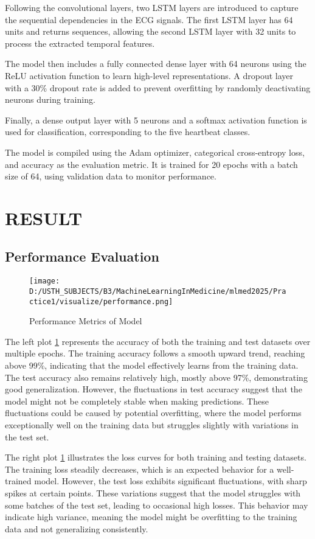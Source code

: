 \documentclass[10pt, conference]{IEEEtran}
\begin{document}
	Following the convolutional layers, two LSTM layers are introduced to capture the sequential dependencies in the ECG signals. The first LSTM layer has 64 units and returns sequences, allowing the second LSTM layer with 32 units to process the extracted temporal features.
	
	The model then includes a fully connected dense layer with 64 neurons using the ReLU activation function to learn high-level representations. A dropout layer with a 30\% dropout rate is added to prevent overfitting by randomly deactivating neurons during training.
	
	Finally, a dense output layer with 5 neurons and a softmax activation function is used for classification, corresponding to the five heartbeat classes.
	
	The model is compiled using the Adam optimizer, categorical cross-entropy loss, and accuracy as the evaluation metric. It is trained for 20 epochs with a batch size of 64, using validation data to monitor performance. 
	
	\section{\textbf{R}ESULT}
	\subsection{Performance Evaluation}
	
	\begin{figure}[H]
		\centering
		\texttt{[image: D:/USTH\_SUBJECTS/B3/MachineLearningInMedicine/mlmed2025/Practice1/visualize/performance.png]}
		\caption{Performance Metrics of Model}
		\label{fig:performance}
	\end{figure}
	
	The left plot \ref{fig:performance} represents the accuracy of both the training and test datasets over multiple epochs. The training accuracy follows a smooth upward trend, reaching above 99\%, indicating that the model effectively learns from the training data. The test accuracy also remains relatively high, mostly above 97\%, demonstrating good generalization. However, the fluctuations in test accuracy suggest that the model might not be completely stable when making predictions. These fluctuations could be caused by potential overfitting, where the model performs exceptionally well on the training data but struggles slightly with variations in the test set.
	
	The right plot \ref{fig:performance} illustrates the loss curves for both training and testing datasets. The training loss steadily decreases, which is an expected behavior for a well-trained model. However, the test loss exhibits significant fluctuations, with sharp spikes at certain points. These variations suggest that the model struggles with some batches of the test set, leading to occasional high losses. This behavior may indicate high variance, meaning the model might be overfitting to the training data and not generalizing consistently.
	
\end{document}
